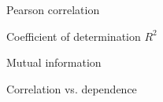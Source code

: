 \documentclass[10pt,compress,t,notes=noshow, xcolor=table]{beamer}
\date{}
\begin{document}
{
\item Pearson correlation
\item Coefficient of determination $R^2$
\item Mutual information
\item Correlation vs. dependence
}

%
%
%
%
\end{document}
